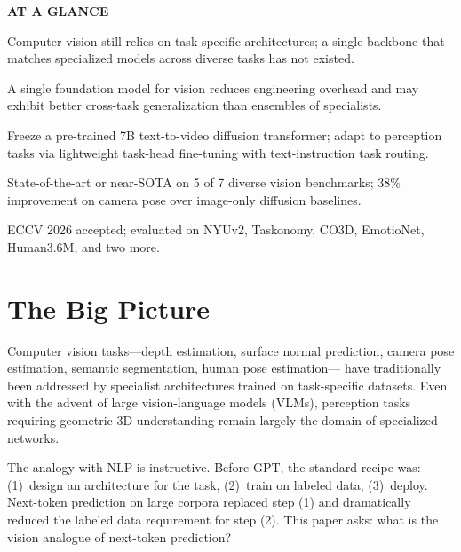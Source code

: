 \documentclass[10pt,twocolumn]{article}
\begin{document}
\begin{mdframed}[backgroundcolor=boxgray,linecolor=rulered,linewidth=1pt,
    innerleftmargin=6pt,innerrightmargin=6pt,
    innertopmargin=6pt,innerbottommargin=6pt]
\textbf{\small AT A GLANCE}\par\vspace{4pt}
\begin{description}[leftmargin=0pt,labelsep=4pt,itemsep=2pt,parsep=0pt,
    font=\small\bfseries]
  \item[Problem:] Computer vision still relies on task-specific
    architectures; a single backbone that matches specialized models
    across diverse tasks has not existed.
  \item[Why it matters:] A single foundation model for vision
    reduces engineering overhead and may exhibit better cross-task
    generalization than ensembles of specialists.
  \item[Method:] Freeze a pre-trained 7B text-to-video diffusion
    transformer; adapt to perception tasks via lightweight task-head
    fine-tuning with text-instruction task routing.
  \item[Result:] State-of-the-art or near-SOTA on 5 of 7 diverse
    vision benchmarks; 38\% improvement on camera pose over image-only
    diffusion baselines.
  \item[Evidence:] ECCV 2026 accepted; evaluated on NYUv2, Taskonomy,
    CO3D, EmotioNet, Human3.6M, and two more.
\end{description}
\end{mdframed}

\section{The Big Picture}

Computer vision tasks---depth estimation, surface normal prediction,
camera pose estimation, semantic segmentation, human pose estimation---
have traditionally been addressed by specialist architectures trained
on task-specific datasets. Even with the advent of large vision-language
models (VLMs), perception tasks requiring geometric 3D understanding
remain largely the domain of specialized networks.

The analogy with NLP is instructive. Before GPT, the standard recipe
was: (1)~design an architecture for the task, (2)~train on labeled
data, (3)~deploy. Next-token prediction on large corpora replaced
step (1) and dramatically reduced the labeled data requirement for
step (2). This paper asks: what is the vision analogue of next-token
prediction?
\end{document}

